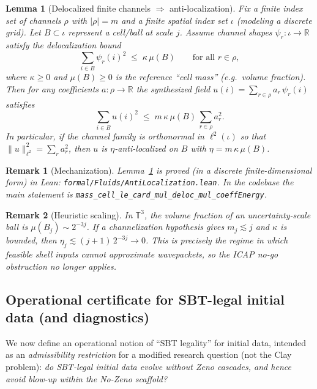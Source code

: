 \documentclass[11pt]{article}
\newcommand{\R}{\mathbb{R}}
\newcommand{\T}{\mathbb{T}}
\newtheorem{lemma}{Lemma}
\newtheorem{remark}{Remark}
\begin{document}
\begin{lemma}[Delocalized finite channels $\Rightarrow$ anti-localization]
\label{lem:channel-antiloc}
Fix a finite index set of channels $\rho$ with $|\rho|=m$ and a finite spatial index set $\iota$
(modeling a discrete grid). Let $B\subset \iota$ represent a cell/ball at scale $j$.
Assume channel shapes $\psi_r:\iota\to\R$ satisfy the delocalization bound
\[
\sum_{i\in B} \psi_r(i)^2 \;\le\; \kappa\,\mu(B)\qquad \text{for all }r\in\rho,
\]
where $\kappa\ge 0$ and $\mu(B)\ge 0$ is the reference ``cell mass'' (e.g.\ volume fraction).
Then for any coefficients $a:\rho\to\R$ the synthesized field
$u(i)=\sum_{r\in\rho} a_r\,\psi_r(i)$ satisfies
\begin{equation}
\label{eq:finite-channel-antiloc}
\sum_{i\in B} u(i)^2
\;\le\;
m\,\kappa\,\mu(B)\,\sum_{r\in\rho} a_r^2.
\end{equation}
In particular, if the channel family is orthonormal in $\ell^2(\iota)$ so that
$\|u\|_{\ell^2}^2=\sum_r a_r^2$, then $u$ is $\eta$-anti-localized on $B$ with
$\eta = m\,\kappa\,\mu(B)$.
\end{lemma}

\begin{remark}[Mechanization]
Lemma~\ref{lem:channel-antiloc} is proved (in a discrete finite-dimensional form) in Lean:
\texttt{formal/Fluids/AntiLocalization.lean}. In the codebase the main statement is
\nolinkurl{mass_cell_le_card_mul_deloc_mul_coeffEnergy}.
\end{remark}

\begin{remark}[Heuristic scaling]
In $\T^3$, the volume fraction of an uncertainty-scale ball is $\mu(B_j)\sim 2^{-3j}$.
If a channelization hypothesis gives $m_j\lesssim j$ and $\kappa$ is bounded, then
$\eta_j \lesssim (j+1)\,2^{-3j}\to 0$. This is precisely the regime in which feasible shell inputs
cannot approximate wavepackets, so the ICAP no-go obstruction no longer applies.
\end{remark}

\subsection{Operational certificate for SBT-legal initial data (and diagnostics)}

We now define an operational notion of ``SBT legality'' for initial data, intended as an
\emph{admissibility restriction} for a modified research question (not the Clay problem):
\emph{do SBT-legal initial data evolve without Zeno cascades, and hence avoid blow-up within
the No-Zeno scaffold?}
\end{document}
